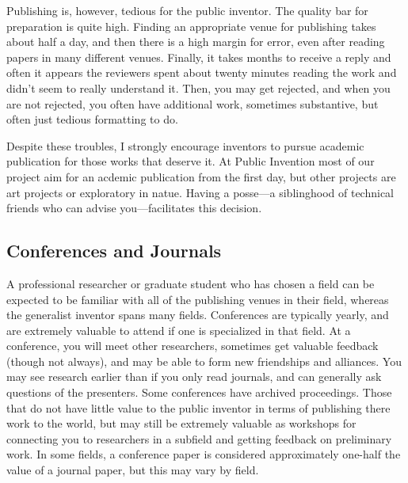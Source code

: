 \documentclass[
	fontsize=10pt, %
	twoside=false, %
	secnumdepth=1, %
]{kaobook}
\begin{document}
Publishing is, however, tedious for the public inventor.
The quality bar for preparation is quite high.
Finding an appropriate venue for publishing takes about half a day, and
then there is a high margin for error, even after reading papers in many
different venues.
Finally, it takes months to receive a reply and often it appears
the reviewers spent about twenty minutes reading the work and didn't seem
to really understand it.
Then, you may get rejected, and when you are not rejected, you often
have additional work, sometimes substantive, but often just tedious formatting to do.

Despite these troubles, I strongly encourage inventors to pursue
academic publication for those works that deserve it. At Public Invention
most of our project aim for an acdemic publication from the first day,
but other projects are art projects or exploratory in natue.
Having a posse---a siblinghood of technical friends who can advise you---facilitates this decision.

\subsection{Conferences and Journals}

A professional researcher or graduate student who has chosen a field can be expected to be familiar
with all of the publishing venues in their field, whereas the generalist inventor spans many fields.
Conferences are typically yearly, and are extremely valuable to attend if one is specialized in that
field. At a conference, you will meet other researchers, sometimes get valuable feedback (though
not always), and may be able to form new friendships and alliances. You may see research earlier
than if you only read journals, and can generally ask questions of the presenters.
Some conferences have archived proceedings. Those that do not have little value
to the public inventor in terms of publishing there work to the world, but may still
be extremely valuable as workshops for connecting you to researchers in a subfield and
getting feedback on preliminary work. In some fields, a conference paper is considered
approximately one-half the value of a journal paper, but this may vary by field.
\end{document}

